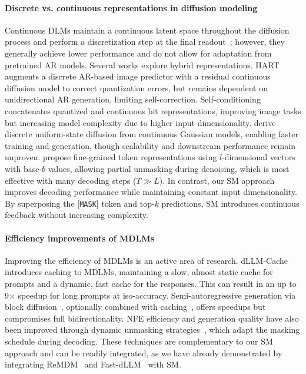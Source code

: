 \documentclass{article}
\newcommand{\mask}{[\texttt{MASK}]\xspace}
\begin{document}
\paragraph{Discrete vs. continuous representations in diffusion modeling}
Continuous DLMs maintain a continuous latent space throughout the diffusion process and perform a discretization step at the final readout~\citep{li_diffusion-lm_2022, dieleman_continuous_2022, gong_diffuseq_2022,strudel_self-conditioned_2022, gong_diffuseq-v2_2023, gulrajani_likelihood-based_2023}; however, they generally achieve lower performance and do not allow for adaptation from pretrained AR models. 
% 
Several works explore hybrid representations.
HART~\citep{tang_hart_2025} augments a discrete AR-based image predictor with a residual continuous diffusion model to correct quantization errors, but remains dependent on unidirectional AR generation, limiting self-correction.
Self-conditioning~\citep{chen_analog_2023} concatenates quantized and continuous bit representations, improving image tasks but increasing model complexity due to higher input dimensionality.
%
\citet{sahoo_diffusion_2025} derive discrete uniform-state diffusion from continuous Gaussian models, enabling faster training and generation, though scalability and downstream performance remain unproven.
%
\citet{chao_beyond_2025} propose fine-grained token representations using $l$-dimensional vectors with base-$b$ values, allowing partial unmasking during denoising, which is most effective with many decoding steps ($T \gg L$).
% 
In contrast, our SM approach improves decoding performance while maintaining constant input dimensionality. By superposing the \mask token and top-$k$ predictions, SM introduces continuous feedback without increasing complexity.


% 
\paragraph{Efficiency improvements of MDLMs}
Improving the efficiency of MDLMs is an active area of research.
% 
dLLM-Cache~\citep{liu_dllm-cache_2025} introduces caching to MDLMs, maintaining a slow, almost static cache for prompts and a dynamic, fast cache for the responses. 
% 
This can result in an up to 9$\times$ speedup for long prompts at iso-accuracy. 
% 
Semi-autoregressive generation via block diffusion~\citep{arriola_block_2024, nie_large_2025}, optionally combined with caching~\citep{wu_fast-dllm_2025}, offers speedups but compromises full bidirectionality.
% 
NFE efficiency and generation quality have also been improved through dynamic unmasking strategies~\citep{jin_thinking_2025, wei_accelerating_2025, wang_remasking_2025}, which adapt the masking schedule during decoding.
% 
These techniques are complementary to our SM approach and can be readily integrated, as we have already demonstrated by integrating ReMDM~\citep{wang_remasking_2025} and Fast-dLLM~\citep{wu_fast-dllm_2025} with SM. 
\end{document}
